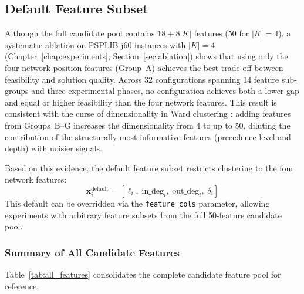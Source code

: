 \subsection{Default Feature Subset}
\label{subsec:default_features}
Although the full candidate pool contains $18 + 8|K|$ features
($50$ for $|K|=4$), a systematic ablation on PSPLIB j60
instances with $|K|=4$ (Chapter~\ref{chap:experiments},
Section~\ref{sec:ablation}) shows that using only the four
network position features (Group~A) achieves the best
trade-off between feasibility and solution quality. Across 32
configurations spanning 14 feature sub-groups and three
experimental phases, no configuration achieves both a lower gap
and equal or higher feasibility than the four network features. This result is consistent with the curse of
dimensionality in Ward clustering \parencite{Bellman1954}: adding
features from Groups~B--G increases the dimensionality from 4 to
up to 50, diluting the contribution of the structurally most
informative features (precedence level and depth) with noisier
signals.

Based on this evidence, the default feature subset restricts
clustering to the four network features:
\begin{equation}
    \mathbf{x}_i^{\mathrm{default}} =
    [\ell_i,\;\mathrm{in\_deg}_i,\;
     \mathrm{out\_deg}_i,\;\delta_i]
    \label{eq:default_features}
\end{equation}
This default can be overridden via the \texttt{feature\_cols}
parameter, allowing experiments with arbitrary feature subsets
from the full 50-feature candidate pool.

\subsubsection*{Summary of All Candidate Features}

Table~\ref{tab:all_features} consolidates the complete
candidate feature pool for reference.

